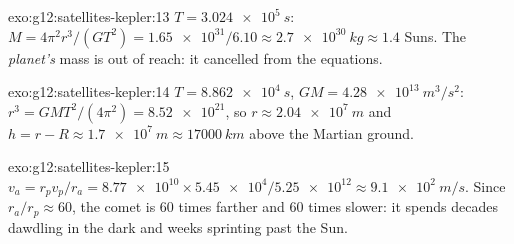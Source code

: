\begin{solution}{exo:g12:satellites-kepler:13}
$T = \qty{3.024e5}{s}$: $M = 4\pi^2 r^3/(GT^2) =
\num{1.65e31}/6.10 \approx \qty{2.7e30}{kg} \approx 1.4$ Suns. The
\emph{planet's} mass is out of reach: it cancelled from the 
equations.
\end{solution}

\begin{solution}{exo:g12:satellites-kepler:14}
$T = \qty{8.862e4}{s}$, $GM = \qty{4.28e13}{m^3/s^2}$:
$r^3 = GMT^2/(4\pi^2) = \num{8.52e21}$, so $r \approx
\qty{2.04e7}{m}$ and $h = r - R \approx \qty{1.7e7}{m} \approx
\qty{17000}{km}$ above the Martian ground.
\end{solution}

\begin{solution}{exo:g12:satellites-kepler:15}
$v_a = r_p v_p / r_a = \num{8.77e10} \times \num{5.45e4} /
\num{5.25e12} \approx \qty{9.1e2}{m/s}$. Since $r_a/r_p \approx 60$,
the comet is $60$ times farther and $60$ times slower: it spends
decades dawdling in the dark and weeks sprinting past the Sun.
\end{solution}

